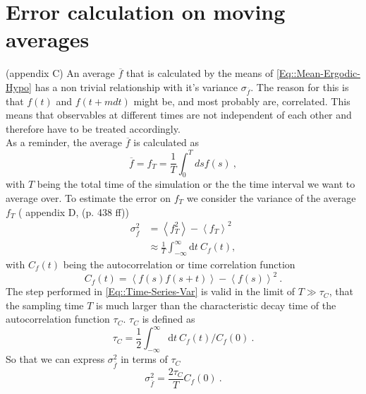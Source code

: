 	\section{Error calculation on moving averages} \label{Section::Error-Calc}
	\cite{madras1988pivot} (appendix C) 
	An average $\overline{f}$ that is calculated by the means of \autoref{Eq::Mean-Ergodic-Hypo} has a non trivial relationship with it's variance $\sigma_{\overline{f}}$. The reason for this is that $f(t)$ and $f(t + mdt)$ might be, and most probably are, correlated. This means that observables at different times are not independent of each other and therefore have to be treated accordingly. \\
	
	As a reminder, the average $\overline{f}$ is calculated as
	\begin{equation}
		\overline{f} = f_T =	\frac{1}{T} \int_0^{T} ds f(s) ~,
	\end{equation}
	with $T$ being the total time of the simulation or the the time interval we want to average over. To estimate the error on $f_T$ we consider the variance of the average $f_T$ (\cite{frenkel2023understanding} appendix D, \cite{anderson2011statistical} (p. 438 ff))
	\begin{equation} \label{Eq::Time-Series-Var}
		\begin{split}
			\sigma_{\overline{f}}^2 &=	\left \langle f_T^2 \right \rangle - \left \langle f_T \right \rangle^2 \\
			&\approx \frac{1}{T} \int_{-\infty}^{\infty} \text{d}t~C_f(t),
		\end{split}		
	\end{equation}
	with $C_f(t)$ being the autocorrelation or time correlation function
	\begin{equation} \label{Eq::Autorcorrlation-Time}
		C_f(t) =	\left \langle f(s) f(s + t) \right \rangle - \left \langle f(s) \right \rangle^2~.
	\end{equation}
	The step performed in \autoref{Eq::Time-Series-Var} is valid in the limit of $T \gg \tau_C$, that the sampling time $T$ is much larger than the characteristic decay time of the autocorrelation function $\tau_C$. $\tau_C$ is defined as
	\begin{equation}
		\tau_C = \frac{1}{2}	\int_{-\infty}^{\infty} \text{d}t~C_f(t) /	C_f(0)~.
	\end{equation}
	So that we can express $\sigma_{\overline{f}}^2$ in terms of $\tau_C$
	\begin{equation}
		\sigma_{\overline{f}}^2 =	\frac{2\tau_C}{T} C_f(0)~.
	\end{equation}
